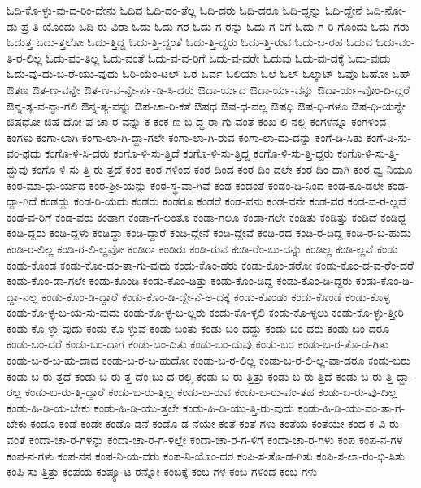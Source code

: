 {ಓದಿ-ಕೊ-ಳ್ಳು-ವು-ದ-ರಿಂ-ದೇನು
ಓದಿದ
ಓದಿ-ದಂ-ತೆಲ್ಲ
ಓದಿ-ದರು
ಓದಿ-ದರೂ
ಓದಿ-ದ್ದನ್ನು
ಓದಿ-ದ್ದೇನೆ
ಓದಿ-ನೋ-ಡು-ಪ್ರ-ತಿ-ಯೊಂದು
ಓದಿ-ರು-ವಿರಾ
ಓದು
ಓದು-ಗರ
ಓದು-ಗ-ರನ್ನು
ಓದು-ಗ-ರಿಗೆ
ಓದು-ಗ-ರಿ-ಗೊಂದು
ಓದು-ಗರು
ಓದುತ್ತ
ಓದು-ತ್ತಲೋ
ಓದು-ತ್ತಿದ್ದ
ಓದು-ತ್ತಿ-ದ್ದಂತೆ
ಓದು-ತ್ತಿ-ದ್ದರು
ಓದು-ತ್ತಿ-ರುವ
ಓದು-ಬ-ರಹ
ಓದುವ
ಓದು-ವಂ-ತಿ-ರ-ಲಿಲ್ಲ
ಓದು-ವಂ-ತಿಲ್ಲ
ಓದು-ವಂತೆ
ಓದು-ವ-ವ-ರಿಗೆ
ಓದು-ವ-ವರೇ
ಓದುವು
ಓದು-ವು-ದಕ್ಕೆ
ಓದು-ವುದು
ಓದು-ವು-ದು-ಬ-ರೆ-ಯು-ವುದು
ಓರಿ-ಯೆಂ-ಟಲ್
ಓರೆ
ಓರ್ವ
ಓಲಿಯಾ
ಓಲೆ
ಓಲ್
ಓಲ್ಕಾಟ್
ಓವೊ
ಓಹೋ
ಓಹ್
ಔತಣ
ಔತ-ಣ-ವನ್ನೇ
ಔತ-ಣ-ವ-ನ್ನೇ-ರ್ಪ-ಡಿ-ಸಿ-ದರು
ಔದಾ-ರ್ಯದ
ಔದಾ-ರ್ಯ-ವನ್ನು
ಔದಾ-ರ್ಯ-ವೊಂ-ದಿ-ದ್ದರೆ
ಔನ್ನ-ತ್ಯ-ವ-ನ್ನಾ-ಗಲಿ
ಔನ್ನ-ತ್ಯ-ವನ್ನು
ಔಪ-ಚಾ-ರಿ-ಕತೆ
ಔಷಧ
ಔಷ-ಧ-ವಲ್ಲ
ಔಷಧಿ
ಔಷ-ಧಿ-ಗಳೂ
ಔಷ-ಧಿ-ಯನ್ನೇ
ಔಷಧೋ
ಔಷ-ಧೋ-ಪ-ಚಾ-ರ-ವನ್ನು
ಕ
ಕಂಕ-ಣ-ಬ-ದ್ಧ-ರಾ-ಗು-ವಂತೆ
ಕಂಖ-ಲಿ-ನಲ್ಲಿ
ಕಂಗಳನ್ನೂ
ಕಂಗಳಿಂದ
ಕಂಗಳು
ಕಂಗಾ-ಲಾಗಿ
ಕಂಗಾ-ಲಾ-ಗಿ-ದ್ದಾ-ಗಲೇ
ಕಂಗಾ-ಲಾ-ಗಿ-ರುವ
ಕಂಗಾ-ಲಾ-ದು-ದನ್ನು
ಕಂಗೆ-ಡಿ-ಸಿತು
ಕಂಗೆ-ಡಿ-ಸು-ವಂ-ಥದು
ಕಂಗೊ-ಳಿ-ಸಿ-ದರು
ಕಂಗೊ-ಳಿ-ಸು-ತ್ತಿದೆ
ಕಂಗೊ-ಳಿ-ಸು-ತ್ತಿದ್ದ
ಕಂಗೊ-ಳಿ-ಸು-ತ್ತಿ-ದ್ದರು
ಕಂಗೊ-ಳಿ-ಸು-ತ್ತಿ-ದ್ದುವು
ಕಂಗೊ-ಳಿ-ಸು-ತ್ತಿ-ರು-ತ್ತದೆ
ಕಂಠ
ಕಂಠ-ಗಳಿಂದ
ಕಂಠ-ದಿಂದ
ಕಂಠ-ದಿಂ-ದಲೇ
ಕಂಠ-ದಿಂ-ದಾಗಿ
ಕಂಠ-ಧ್ವ-ನಿಯೂ
ಕಂಠ-ಮಾ-ಧು-ರ್ಯದ
ಕಂಠ-ಶ್ರೀ-ಯನ್ನು
ಕಂಠ-ಸ್ಥ-ವಾ-ಗಿವೆ
ಕಂಡ
ಕಂಡಂತೆ
ಕಂಡಂ-ದಿ-ನಿಂದ
ಕಂಡ-ಕೂ-ಡಲೇ
ಕಂಡ-ದ್ದಾ-ಗಿದೆ
ಕಂಡದ್ದು
ಕಂಡ-ರಿ-ಯದು
ಕಂಡರು
ಕಂಡರೂ
ಕಂಡರೆ
ಕಂಡ-ವನು
ಕಂಡ-ವನೇ
ಕಂಡ-ವರ
ಕಂಡ-ವ-ರ-ಲ್ಲವೆ
ಕಂಡ-ವ-ರಿಗೆ
ಕಂಡ-ವರು
ಕಂಡಾಗ
ಕಂಡಾ-ಗ-ಲಂತೂ
ಕಂಡಾ-ಗಲೂ
ಕಂಡಾ-ಗಲೇ
ಕಂಡಿತು
ಕಂಡಿತ್ತು
ಕಂಡಿದೆ
ಕಂಡಿದ್ದ
ಕಂಡಿ-ದ್ದರು
ಕಂಡಿ-ದ್ದಳು
ಕಂಡಿದ್ದಾ
ಕಂಡಿ-ದ್ದಾರೆ
ಕಂಡಿ-ದ್ದೇನೆ
ಕಂಡಿ-ದ್ದೇವೆ
ಕಂಡಿ-ರದ
ಕಂಡಿ-ರ-ದಿದ್ದ
ಕಂಡಿ-ರ-ಬ-ಹುದು
ಕಂಡಿ-ರ-ಲಿಲ್ಲ
ಕಂಡಿ-ರ-ಲಿ-ಲ್ಲವೋ
ಕಂಡಿರಾ
ಕಂಡಿರು
ಕಂಡಿ-ರುವ
ಕಂಡಿ-ರೆಂ-ಬು-ದನ್ನು
ಕಂಡಿಲ್ಲ
ಕಂಡಿ-ಲ್ಲವೆ
ಕಂಡು
ಕಂಡು-ಕೊಂಡ
ಕಂಡು-ಕೊಂ-ಡಂ-ತಾ-ಗು-ವುದು
ಕಂಡು-ಕೊಂ-ಡರು
ಕಂಡು-ಕೊಂ-ಡರೋ
ಕಂಡು-ಕೊಂ-ಡ-ವ-ರೆಂ-ದರೆ
ಕಂಡು-ಕೊಂ-ಡಾ-ಗಲೇ
ಕಂಡು-ಕೊಂಡಿ
ಕಂಡು-ಕೊಂ-ಡಿತ್ತು
ಕಂಡು-ಕೊಂ-ಡಿದ್ದ
ಕಂಡು-ಕೊಂ-ಡಿ-ದ್ದರು
ಕಂಡು-ಕೊಂ-ಡಿ-ದ್ದಾ-ನಲ್ಲ
ಕಂಡು-ಕೊಂ-ಡಿ-ದ್ದಾರೆ
ಕಂಡು-ಕೊಂ-ಡಿ-ದ್ದೇ-ನೆ-ಅ-ದಕ್ಕೆ
ಕಂಡು-ಕೊಂಡು
ಕಂಡು-ಕೊಂಡೆ
ಕಂಡು-ಕೊಳ್ಳ
ಕಂಡು-ಕೊ-ಳ್ಳ-ಬ-ಯ-ಸು-ವುದು
ಕಂಡು-ಕೊ-ಳ್ಳ-ಬ-ಲ್ಲರು
ಕಂಡು-ಕೊ-ಳ್ಳಲಿ
ಕಂಡು-ಕೊ-ಳ್ಳಲು
ಕಂಡು-ಕೊ-ಳ್ಳು-ತ್ತೀರಿ
ಕಂಡು-ಕೊ-ಳ್ಳು-ವುದು
ಕಂಡು-ಕೊ-ಳ್ಳುವೆ
ಕಂಡು-ಬಂತು
ಕಂಡು-ಬಂ-ದದ್ದು
ಕಂಡು-ಬಂ-ದರು
ಕಂಡು-ಬಂ-ದರೂ
ಕಂಡು-ಬಂ-ದರೆ
ಕಂಡು-ಬಂ-ದಾಗ
ಕಂಡು-ಬಂ-ದಿತು
ಕಂಡು-ಬಂ-ದುವು
ಕಂಡು-ಬರ
ಕಂಡು-ಬ-ರ-ತೊ-ಡ-ಗಿತು
ಕಂಡು-ಬ-ರ-ಬ-ಹು-ದಾದ
ಕಂಡು-ಬ-ರ-ಬ-ಹುದೋ
ಕಂಡು-ಬ-ರ-ಲಿಲ್ಲ
ಕಂಡು-ಬ-ರ-ಲಿ-ಲ್ಲ-ವಾ-ದರೂ
ಕಂಡು-ಬರು
ಕಂಡು-ಬ-ರು-ತ್ತದೆ
ಕಂಡು-ಬ-ರು-ತ್ತ-ದೆಂ-ಬು-ದ-ರಲ್ಲಿ
ಕಂಡು-ಬ-ರು-ತ್ತಿತ್ತು
ಕಂಡು-ಬ-ರು-ತ್ತಿದೆ
ಕಂಡು-ಬ-ರು-ತ್ತಿ-ದ್ದಾ-ರಲ್ಲ
ಕಂಡು-ಬ-ರು-ತ್ತಿ-ದ್ದಾರೆ
ಕಂಡು-ಬ-ರು-ತ್ತಿಲ್ಲ
ಕಂಡು-ಬ-ರುವ
ಕಂಡು-ಬ-ರು-ವಂ-ತಹ
ಕಂಡು-ಬ-ರು-ವು-ದಿಲ್ಲ
ಕಂಡು-ಹಿ-ಡಿ-ಯ-ಬೇಕು
ಕಂಡು-ಹಿ-ಡಿ-ಯು-ತ್ತಲೇ
ಕಂಡು-ಹಿ-ಡಿ-ಯು-ತ್ತಿ-ರು-ವುದು
ಕಂಡು-ಹಿ-ಡಿ-ಯು-ವಂ-ತಾ-ಗ-ಬೇಕು
ಕಂಡೂ
ಕಂಡೆ
ಕಂಡೇ
ಕಂಡೊ-ಡನೆ
ಕಂಡೊ-ಡ-ನೆಯೇ
ಕಂತೆ
ಕಂತೆ-ಗಳು
ಕಂತೆಯ
ಕಂತೆಯೇ
ಕಂದ-ಕ-ವಿ-ರು-ವಂತೆ
ಕಂದಾ-ಚಾ-ರ-ಗಳನ್ನು
ಕಂದಾ-ಚಾ-ರ-ಗ-ಳಲ್ಲೇ
ಕಂದಾ-ಚಾ-ರ-ಗ-ಳಿಗೆ
ಕಂದಾ-ಚಾ-ರ-ಗಳು
ಕಂಪ
ಕಂಪ-ನ-ಗಳ
ಕಂಪ-ನ-ಗಳು
ಕಂಪ-ನನ
ಕಂಪ-ನಿ-ಯ-ವರು
ಕಂಪ-ನಿ-ಯೊಂ-ದರ
ಕಂಪಿ-ಸ-ತೊ-ಡ-ಗಿತು
ಕಂಪಿ-ಸ-ಲಾ-ರಂ-ಭಿ-ಸಿತು
ಕಂಪಿ-ಸು-ತ್ತಿತ್ತು
ಕಂಪೆಯ
ಕಂಪ್ಯೂ-ಟ-ರನ್ನೋ
ಕಂಬಕ್ಕೆ
ಕಂಬ-ಗಳ
ಕಂಬ-ಗಳಿಂದ
ಕಂಬ-ಗಳು
}
